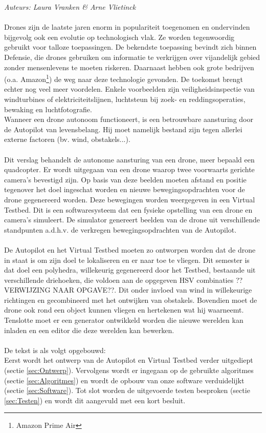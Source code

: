 {\em Auteurs: Laura Vranken \& Arne Vlietinck}
\\\\
\noindent
Drones zijn de laatste jaren enorm in populariteit toegenomen en ondervinden bijgevolg ook een evolutie op technologisch vlak. Ze worden tegenwoordig gebruikt voor talloze toepassingen. De bekendste toepassing bevindt zich binnen Defensie, die drones gebruiken om informatie te verkrijgen over vijandelijk gebied zonder mensenlevens te moeten riskeren. Daarnaast hebben ook grote bedrijven (o.a. Amazon\footnote{Amazon Prime Air}) de weg naar deze technologie gevonden. De toekomst brengt echter nog veel meer voordelen. Enkele voorbeelden  \cite{website:microdrones} zijn veiligheidsinspectie van windturbines of elektriciteitslijnen, luchtsteun bij zoek- en reddingsoperaties, bewaking en luchtfotografie.
\\
Wanneer een drone autonoom functioneert, is een betrouwbare aansturing door de Autopilot van levensbelang. Hij moet namelijk bestand zijn tegen allerlei externe factoren (bv. wind, obstakels...).
\\
\\
Dit verslag behandelt de autonome aansturing van een drone, meer bepaald een quadcopter. Er wordt uitgegaan van een drone waarop twee voorwaarts gerichte camera's bevestigd zijn. Op basis van deze beelden moeten afstand en positie tegenover het doel ingeschat worden en nieuwe bewegingsopdrachten voor de drone gegenereerd worden. Deze bewegingen worden weergegeven in een Virtual Testbed. Dit is een softwaresysteem dat een fysieke opstelling van een drone en camera's simuleert. De simulator genereert beelden van de drone uit verschillende standpunten a.d.h.v. de verkregen bewegingsopdrachten van de Autopilot. 
\\
\\
De Autopilot en het Virtual Testbed moeten zo ontworpen worden dat de drone in staat is om zijn doel te lokaliseren en er naar toe te vliegen. Dit semester is dat doel een polyhedra, willekeurig gegenereerd door het Testbed, bestaande uit verschillende driehoeken, die voldoen aan de opgegeven HSV combinaties ??VERWIJZING NAAR OPGAVE??. Dit onder invloed van wind in willekeurige richtingen en gecombineerd met het ontwijken van obstakels. Bovendien moet de drone ook rond een object kunnen vliegen en hertekenen wat hij waarneemt. Tenslotte moet er een generator ontwikkeld worden die nieuwe werelden kan inladen en een editor die deze werelden kan bewerken.
\\
\\
De tekst is als volgt opgebouwd:\\
Eerst wordt het ontwerp van de Autopilot en Virtual Testbed verder uitgediept (sectie \ref{sec:Ontwerp}). Vervolgens wordt er ingegaan op de gebruikte algoritmes (sectie \ref{sec:Algoritmes}) en wordt de opbouw van onze software verduidelijkt (sectie \ref{sec:Software}). Tot slot worden de uitgevoerde testen besproken (sectie \ref{sec:Testen}) en wordt dit aangevuld met een kort besluit. 
